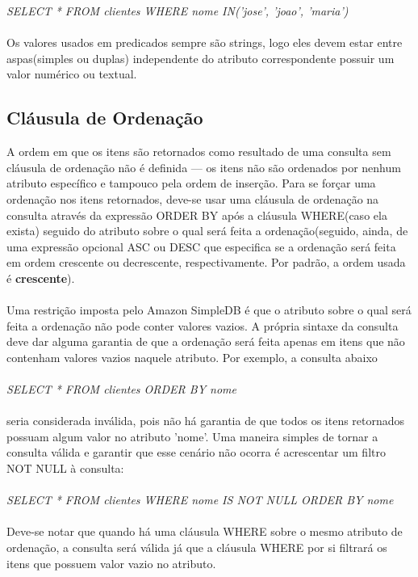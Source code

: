 \textit{SELECT * FROM clientes WHERE nome IN('jose', 'joao', 'maria')} \\\\

Os valores usados em predicados sempre são strings, logo eles devem estar entre aspas(simples ou duplas) independente do atributo correspondente possuir um valor numérico ou textual.

\subsection{Cláusula de Ordenação}
A ordem em que os itens são retornados como resultado de uma consulta sem cláusula de ordenação não é definida --- os itens não são ordenados por nenhum atributo específico e tampouco pela ordem de inserção. Para se forçar uma ordenação nos itens retornados, deve-se usar uma cláusula de ordenação na consulta através da expressão ORDER BY após a cláusula WHERE(caso ela exista) seguido do atributo sobre o qual será feita a ordenação(seguido, ainda, de uma expressão opcional ASC ou DESC que especifica se a ordenação será feita em ordem crescente ou decrescente, respectivamente. Por padrão, a ordem usada é \textbf{crescente}).\\\\

Uma restrição imposta pelo Amazon SimpleDB é que o atributo sobre o qual será feita a ordenação não pode conter valores vazios. A própria sintaxe da consulta deve dar alguma garantia de que a ordenação será feita apenas em itens que não contenham valores vazios naquele atributo. Por exemplo, a consulta abaixo \\\\

\textit{SELECT * FROM clientes ORDER BY nome}\\\\

seria considerada inválida, pois não há garantia de que todos os itens retornados possuam algum valor no atributo 'nome'. Uma maneira simples de tornar a consulta válida e garantir que esse cenário não ocorra é acrescentar um filtro NOT NULL à consulta: \\\\

\textit{SELECT * FROM clientes WHERE nome IS NOT NULL ORDER BY nome} \\\\

Deve-se notar que quando há uma cláusula WHERE sobre o mesmo atributo de ordenação, a consulta será válida já que a cláusula WHERE por si filtrará os itens que possuem valor vazio no atributo.

